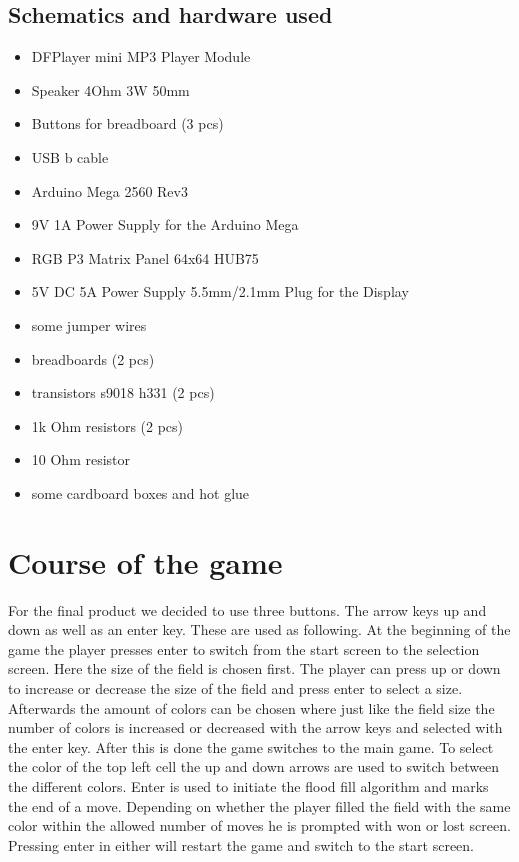 \documentclass[12pt, a4paper]{article}
\begin{document}
\subsection*{Schematics and hardware used}
\begin{itemize}
    \item DFPlayer mini MP3 Player Module
    \item Speaker 4Ohm 3W 50mm
    \item Buttons for breadboard (3 pcs)
    \item USB b cable
    \item Arduino Mega 2560 Rev3
    \item 9V 1A Power Supply for the Arduino Mega
    \item RGB P3 Matrix Panel 64x64 HUB75
    \item 5V DC 5A Power Supply 5.5mm/2.1mm Plug for the Display
    \item some jumper wires
    \item breadboards (2 pcs)
    \item transistors s9018 h331 (2 pcs)
    \item 1k Ohm resistors (2 pcs)
    \item 10 Ohm resistor
    \item some cardboard boxes and hot glue
\end{itemize}

\section*{Course of the game}
For the final product we decided to use three buttons. The arrow keys up and down as well as an enter key. These are used as following. At the beginning of the game the player presses enter to switch from the start screen to the selection screen. Here the size of the field is chosen first. The player can press up or down to increase or decrease the size of the field and press enter to select a size. Afterwards the amount of colors can be chosen where just like the field size the number of colors is increased or decreased with the arrow keys and selected with the enter key. After this is done the game switches to the main game. To select the color of the top left cell the up and down arrows are used to switch between the different colors. Enter is used to initiate the flood fill algorithm and marks the end of a move. Depending on whether the player filled the field with the same color within the allowed number of moves he is prompted with won or lost screen. Pressing enter in either will restart the game and switch to the start screen.\\\\
\end{document}
